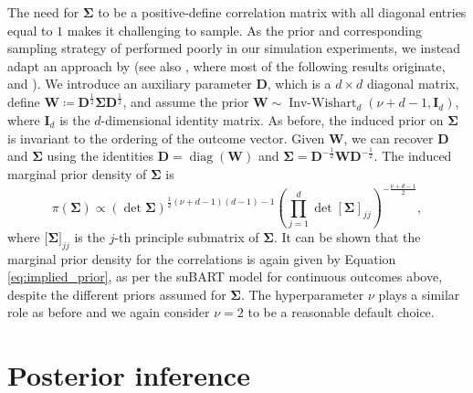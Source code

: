 \documentclass[aoas,preprint]{imsart}
\theoremstyle{plain}
\theoremstyle{definition}
\theoremstyle{remark}
\begin{document}
The need for $\boldsymbol{\Sigma}$ to be a positive-define correlation matrix with all diagonal entries equal to $1$ makes it challenging to sample.
As the prior and corresponding sampling strategy  
of \citet{chib1998analysis} performed poorly in our simulation experiments, we instead adapt an approach by \citet{zhang2020parameter} (see also \citet{barnard2000modeling}, where most of the following results originate, and \citet{zhang2006sampling}). We introduce an auxiliary parameter $\mathbf{D}$, which is a $d \times d$ diagonal matrix, define $\mathbf{W} \coloneqq \mathbf{D}^{\frac{1}{2}} \boldsymbol{\Sigma} \mathbf{D}^{\frac{1}{2}}$, and assume the prior $\mathbf{W} \sim \operatorname{Inv-Wishart}_d (\nu + d - 1, \mathbf{I}_d)$, where $\mathbf{I}_d$ is the $d$-dimensional identity matrix. As before, the induced prior on $\boldsymbol{\Sigma}$ is invariant to the ordering of the outcome vector. Given $\mathbf{W}$, we can recover $\mathbf{D}$ and $\boldsymbol{\Sigma}$ using the identities $\mathbf{D} = \operatorname{diag}(\mathbf{W})$ and $\boldsymbol{\Sigma}=  \mathbf{D}^{-\frac{1}{2}} \mathbf{W} \mathbf{D}^{-\frac{1}{2}}$. The induced marginal prior density of $\boldsymbol{\Sigma}$ is 
\[
\pi\left(\boldsymbol{\Sigma}\right) \propto \left(\det \boldsymbol{\Sigma}\right)^{\frac{1}{2}(\nu+d-1)(d-1)-1} \left(\prod_{j=1}^{d} \det \left\lbrack\boldsymbol{\Sigma}\right\rbrack_{jj} \right)^{-\frac{\nu + d - 1}{2}},
\]
where $\lbrack\boldsymbol{\Sigma}\rbrack_{jj}$ is the $j$-th principle submatrix of $\boldsymbol{\Sigma}$. It can be shown that the marginal prior density for the correlations is again given by Equation \eqref{eq:implied_prior}, as per the suBART model for continuous outcomes above, despite the different priors assumed for $\boldsymbol{\Sigma}$. The hyperparameter $\nu$ plays a similar role as before and we again consider $\nu=2$ to be a reasonable default choice.

\section{Posterior inference}\label{sec:posterior}
\end{document}
